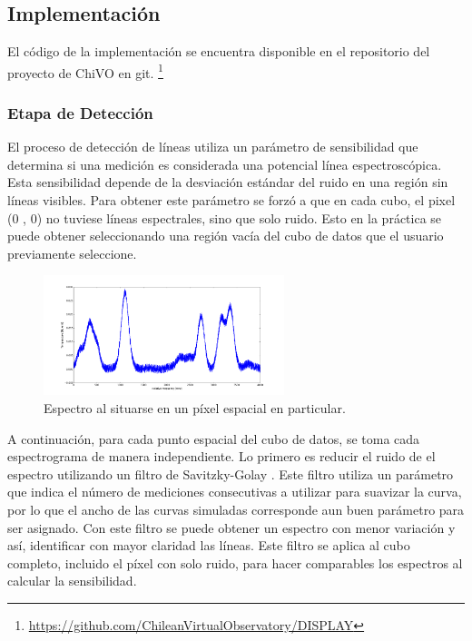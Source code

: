 \documentclass[twocolumn, draft]{emulateapj}
\begin{document}
\subsection{Implementación}

El código de la implementación se encuentra disponible en el repositorio del proyecto de ChiVO en git. \footnote{\url{https://github.com/ChileanVirtualObservatory/DISPLAY}}

\subsubsection{Etapa de Detección}

El proceso de detección de líneas utiliza un parámetro de sensibilidad que determina si una medición es considerada una potencial línea espectroscópica. Esta sensibilidad depende de la desviación estándar del ruido en una región sin líneas visibles. Para obtener este parámetro se forzó a que en cada cubo, el pixel (0 , 0) no tuviese líneas espectrales, sino que solo ruido. Esto en la práctica se puede obtener seleccionando una región vacía del cubo de datos que el usuario previamente seleccione.

\begin{figure}[H]
	\begin{center}
		\includegraphics[width=70mm]{images/fig2}
		\caption{Espectro al situarse en un píxel espacial en particular. }
	\end{center}
\end{figure}

A continuación, para cada punto espacial del cubo de datos, se toma cada espectrograma de manera independiente. Lo primero es reducir el ruido de el espectro utilizando un filtro de Savitzky-Golay \citep{howley_effect_2005}. Este filtro utiliza un parámetro que indica el número de mediciones consecutivas a utilizar para suavizar la curva, por lo que el ancho de las curvas simuladas corresponde aun buen parámetro para ser asignado. Con este filtro se puede obtener un espectro con menor variación y así, identificar con mayor claridad las líneas. Este filtro se aplica al cubo completo, incluido el píxel con solo ruido, para hacer comparables los espectros al calcular la sensibilidad.
\end{document}
